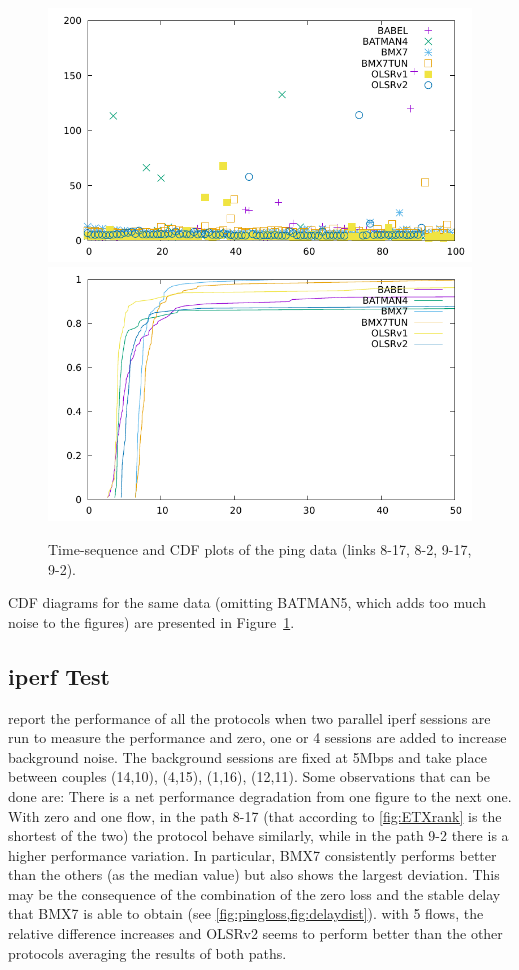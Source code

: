 \documentclass[10pt,onecolumn]{paper}
\begin{document}
\begin{figure}[p]
\includegraphics[width=0.48\linewidth]{images/scatter-failuretest-node9-fc00:2::1.pdf}\hfill%
\includegraphics[width=0.48\linewidth]{images/cdf-failuretest-node9-fc00:2::1.pdf}
\caption{Time-sequence and CDF plots of the ping data (links 8-17, 8-2, 9-17, 9-2).}\label{fig:jch}
\end{figure}

CDF diagrams for the same data (omitting BATMAN5, which adds too much
noise to the figures) are presented in Figure~\ref{fig:jch}.

\FloatBarrier
\subsection{iperf Test}
 report the performance
of all the protocols when two parallel iperf sessions are run to measure the
performance and zero, one or 4 sessions are added to increase background noise.
The background sessions are fixed at 5Mbps and take place between couples
(14,10), (4,15), (1,16), (12,11). Some observations that can be done are:
\bi
\ii There is a net performance degradation from one figure to the next one. 
\ii With zero and one flow, in the path 8-17 (that according to \cref{fig:ETXrank}
is the shortest of the two) the protocol behave similarly, while in the path 9-2
there is a higher performance variation. In particular, BMX7 consistently
performs better than the others (as the median value) but also shows the largest
deviation. This may be the consequence of the combination of the zero loss and
the stable delay that BMX7 is able to obtain (see \cref{fig:pingloss,fig:delaydist}).
\ii with 5 flows, the relative difference increases and OLSRv2 seems to perform
better than the other protocols averaging the results of both paths.
\ei
\end{document}
